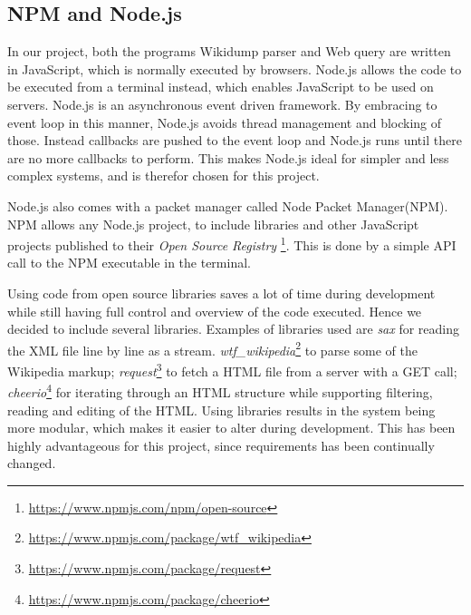 \subsection{NPM and Node.js}
In our project, both the programs Wikidump parser and Web query are written in JavaScript, which is normally executed by browsers. Node.js\cite{node} allows the code to be executed from a terminal instead, which enables JavaScript to be used on servers.  Node.js is an asynchronous event driven framework. By embracing to event loop in this manner, Node.js avoids thread management and blocking of those. Instead callbacks are pushed to the event loop and Node.js runs until there are no more callbacks to perform. This makes Node.js ideal for simpler and less complex systems, and is therefor chosen for this project.

Node.js also comes with a packet manager called Node Packet Manager(NPM). NPM allows any Node.js project, to include libraries and other JavaScript projects published to their \textit{Open Source Registry} \footnote{\url{https://www.npmjs.com/npm/open-source}}. This is done by a simple API call to the NPM executable in the terminal.

Using code from open source libraries saves a lot of time during development while still having full control and overview of the code executed. Hence we decided to include several libraries. Examples of libraries used are \textit{sax} for reading the XML file line by line as a stream.  \textit{wtf\_wikipedia}\footnote{\url{https://www.npmjs.com/package/wtf_wikipedia}} to parse some of the Wikipedia markup;  \textit{request}\footnote{\url{https://www.npmjs.com/package/request}} to fetch a HTML file from a server with a GET call;  \textit{cheerio}\footnote{\url{https://www.npmjs.com/package/cheerio}} for iterating through an HTML structure while supporting filtering, reading and editing of the HTML. Using libraries results in the system being more modular, which makes it easier to alter during development. This has been highly advantageous for this project, since requirements has been continually changed. 


\cleardoublepage